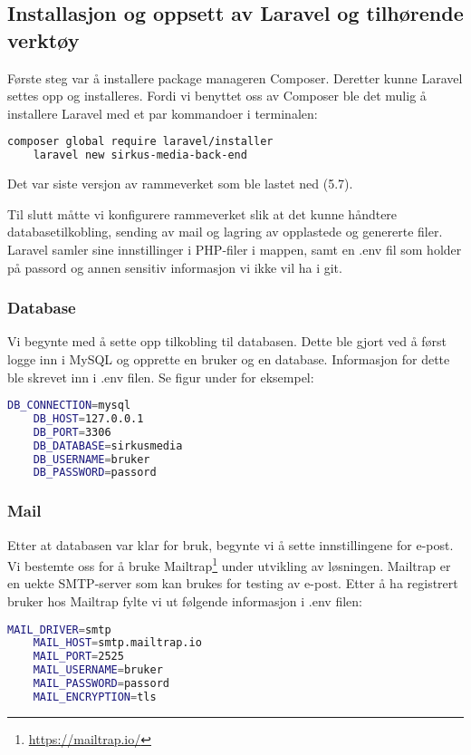 \subsection{Installasjon og oppsett av Laravel og tilhørende verktøy}
Første steg var å installere package manageren Composer. Deretter kunne Laravel settes opp og installeres. Fordi vi benyttet oss av Composer ble det mulig å installere Laravel med et par kommandoer i terminalen:
\begin{lstlisting}[caption={Installasjon av Laravel med Composer},language=bash]
    composer global require laravel/installer
    laravel new sirkus-media-back-end
\end{lstlisting}
Det var siste versjon av rammeverket som ble lastet ned (5.7).

Til slutt måtte vi konfigurere rammeverket slik at det kunne håndtere databasetilkobling, sending av mail og lagring av opplastede og genererte filer. Laravel samler sine innstillinger i PHP-filer i  mappen, samt en .env fil som holder på passord og annen sensitiv informasjon vi ikke vil ha i git.

\subsubsection{Database}
Vi begynte med å sette opp tilkobling til databasen. Dette ble gjort ved å først logge inn i MySQL og opprette en bruker og en database. Informasjon for dette ble skrevet inn i .env filen. Se figur under for eksempel:
\begin{lstlisting}[caption={Laravel .env database secrets},language=bash]
    DB_CONNECTION=mysql
    DB_HOST=127.0.0.1
    DB_PORT=3306
    DB_DATABASE=sirkusmedia
    DB_USERNAME=bruker
    DB_PASSWORD=passord
\end{lstlisting}

\subsubsection{Mail}
Etter at databasen var klar for bruk, begynte vi å sette innstillingene for e-post. Vi bestemte oss for å bruke Mailtrap\footnote{\url{https://mailtrap.io/}} under utvikling av løsningen. Mailtrap\cite{mailtrap2019setfsad} er en uekte SMTP-server som kan brukes for testing av e-post. Etter å ha registrert bruker hos Mailtrap fylte vi ut følgende informasjon i .env filen:
\begin{lstlisting}[caption={Laravel .env mail secrets}, language=bash]
    MAIL_DRIVER=smtp
    MAIL_HOST=smtp.mailtrap.io
    MAIL_PORT=2525
    MAIL_USERNAME=bruker
    MAIL_PASSWORD=passord
    MAIL_ENCRYPTION=tls
\end{lstlisting}

